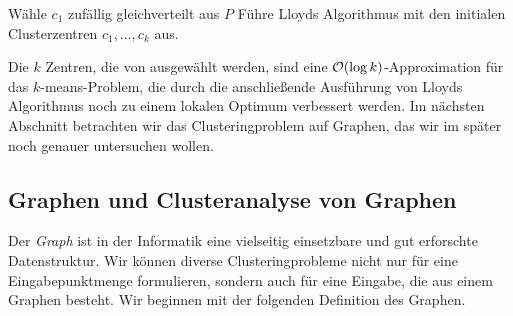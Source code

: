 \begin{algorithm}[H]
\label{algo:kmeanspp}
\caption{\kmpp}
	\DontPrintSemicolon
	
	\BlankLine
	
	Wähle $c_1$ zufällig gleichverteilt aus $P$\;
	Führe Lloyds Algorithmus mit den initialen Clusterzentren $c_1, \dots, c_k$ aus.
\end{algorithm}
Die $k$ Zentren, die von \kmpp{} ausgewählt werden, sind eine $\mathcal{O}(\log k)$-Approximation für das $k$-means-Problem, die durch
die anschließende Ausführung von Lloyds Algorithmus noch zu einem lokalen Optimum verbessert werden.
\absatz
Im nächsten Abschnitt betrachten wir das Clusteringproblem auf Graphen, das wir im später noch genauer untersuchen wollen.

\subsection{Graphen und Clusteranalyse von Graphen}
\label{subsection:basics:graphs}

Der \emph{Graph} ist in der Informatik eine vielseitig einsetzbare und gut erforschte Datenstruktur. Wir können diverse
Clusteringprobleme nicht nur für eine Eingabepunktmenge formulieren, sondern auch für eine Eingabe, die aus einem Graphen
besteht. Wir beginnen mit der folgenden Definition des Graphen.

